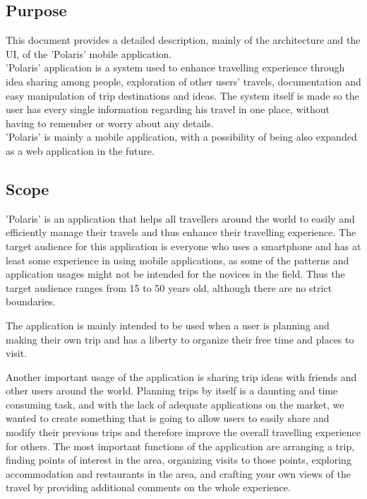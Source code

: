 \subsection{Purpose}
\hspace{\parindent}This document provides a detailed description, mainly of the  architecture and the UI, of the 'Polaris' mobile application.\\
'Polaris' application is a system used to enhance travelling experience through idea sharing among people, exploration of other users' travels, documentation and easy manipulation of trip destinations and ideas. The system itself is made so the user has every single information regarding his travel in one place, without having to remember or worry about any details.\\
'Polaris' is mainly a mobile application, with a possibility of being also expanded as a web application in the future.  
\newpage

\subsection{Scope}
\hspace{\parindent}'Polaris' is an application that helps all travellers around the world to easily and efficiently manage their travels and thus enhance their travelling experience. The target audience for this application is everyone who uses a smartphone and has at least some experience in using mobile applications, as some of the patterns and application usages might not be intended for the novices in the field. Thus the target audience ranges from 15 to 50 years old, although there are no strict boundaries.\linebreak


The application is mainly intended to be used when a user is planning and making their own trip and has a liberty to organize their free time and places to visit.\linebreak


Another important usage of the application is sharing trip ideas with friends and other users around the world. Planning trips by itself is a daunting and time consuming task, and with the lack of adequate applications on the market, we wanted to create something that is going to allow users to easily share and modify their previous trips and therefore improve the overall travelling experience for others. 
\break
The most important functions of the application are arranging a trip, finding points of interest in the area, organizing visits to those points, exploring accommodation and restaurants in the area, and crafting your own views of the travel by providing additional comments on the whole experience.


